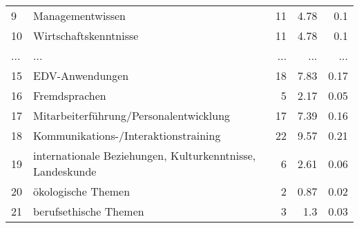 \begin{longtable}{lXrrr}
        9 & \multicolumn{1}{X}{Managementwissen} & %
          \num{11} &
          \num[round-mode=places,round-precision=2]{4,78} &
          \num[round-mode=places,round-precision=2]{0,1} \\
        10 & \multicolumn{1}{X}{Wirtschaftskenntnisse} & %
          \num{11} &
          \num[round-mode=places,round-precision=2]{4,78} &
          \num[round-mode=places,round-precision=2]{0,1} \\
       ... & ... & ... & ... & ... \\
        15 & \multicolumn{1}{X}{EDV-Anwendungen} & %
          \num{18} &
          \num[round-mode=places,round-precision=2]{7,83} &
          \num[round-mode=places,round-precision=2]{0,17} \\

        16 & \multicolumn{1}{X}{Fremdsprachen} & %
          \num{5} &
          \num[round-mode=places,round-precision=2]{2,17} &
          \num[round-mode=places,round-precision=2]{0,05} \\

        17 & \multicolumn{1}{X}{Mitarbeiterführung/Personalentwicklung} & %
          \num{17} &
          \num[round-mode=places,round-precision=2]{7,39} &
          \num[round-mode=places,round-precision=2]{0,16} \\

        18 & \multicolumn{1}{X}{Kommunikations-/Interaktionstraining} & %
          \num{22} &
          \num[round-mode=places,round-precision=2]{9,57} &
          \num[round-mode=places,round-precision=2]{0,21} \\

        19 & \multicolumn{1}{X}{internationale Beziehungen, Kulturkenntnisse, Landeskunde} & %
          \num{6} &
          \num[round-mode=places,round-precision=2]{2,61} &
          \num[round-mode=places,round-precision=2]{0,06} \\

        20 & \multicolumn{1}{X}{ökologische Themen} & %
          \num{2} &
          \num[round-mode=places,round-precision=2]{0,87} &
          \num[round-mode=places,round-precision=2]{0,02} \\

        21 & \multicolumn{1}{X}{berufsethische Themen} & %
          \num{3} &
          \num[round-mode=places,round-precision=2]{1,3} &
          \num[round-mode=places,round-precision=2]{0,03} \\


\end{longtable}
